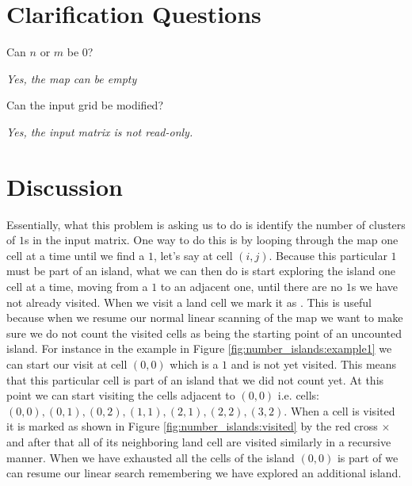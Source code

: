 \section{Clarification Questions}

\begin{QandA}
	\item \begin{questionitem} \begin{question} Can $n$ or $m$ be $0$?  \end{question} 	 
    \begin{answered}
		\textit{Yes, the map can be empty}
	\end{answered} \end{questionitem}
	\item \begin{questionitem} \begin{question} Can the input grid be modified?  \end{question} 	 
    \begin{answered}
		\textit{Yes, the input matrix is not read-only.}
	\end{answered} \end{questionitem}
\end{QandA}

\section{Discussion}
\label{number_islands:sec:discussion}
Essentially, what  this problem is asking us to do is identify the number of clusters of $1$s in the input matrix.
One way to do this is by looping through the map one cell at a time until we find a $1$, let's say at cell $(i,j)$.
Because this particular $1$ must be part of an island, what we can then do is start exploring the island
one cell at a time, moving from a $1$ to an adjacent one, until there are no $1$s we have not already visited.
When we visit a land cell we mark it as .
This is useful because when we resume our normal linear scanning of the map we want to make
sure we do not count the visited cells as being the starting point of an uncounted island.
For instance in the example in Figure \ref{fig:number_islands:example1} we can start our visit
at cell $(0,0)$ which is a $1$ and is not yet visited. This means that this particular cell is
part of an island that we did not count yet. At this point we can start visiting the cells adjacent
to $(0,0)$ i.e. cells: $(0,0), (0,1), (0,2), (1,1), (2,1), (2,2), (3,2)$. When a cell is visited it is
marked as shown in Figure  \ref{fig:number_islands:visited} by the red cross
\textcolor[HTML]{860000}{$\times$} and after that all of its neighboring land cell are visited similarly in a recursive manner.
When we have exhausted all the cells of the island $(0,0)$ is part of we can resume our linear search remembering we have explored an additional island.

